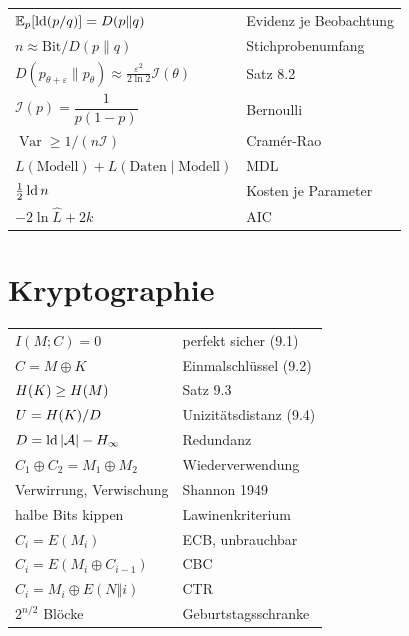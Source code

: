 \begin{merksatz}
\begin{center}
{\small
\renewcommand{\arraystretch}{1.62}
\begin{tabular}{@{}P{4.4cm}P{4.2cm}@{}}
\toprule
$\mathbb{E}_p[\operatorname{ld}(p/q)] = D(p\|q)$ & Evidenz je Beobachtung\\
$n \approx \text{Bit}/D(p\|q)$ & Stichprobenumfang\\
$D(p_{\theta+\varepsilon}\|p_\theta) \approx \frac{\varepsilon^2}{2\ln2}\mathcal I(\theta)$ & Satz 8.2\\
$\mathcal I(p) = \dfrac{1}{p(1-p)}$ & Bernoulli\\
$\operatorname{Var} \ge 1/(n\mathcal I)$ & Cramér-Rao\\
$L(\text{Modell})+L(\text{Daten}\mid\text{Modell})$ & MDL\\
$\tfrac12\operatorname{ld} n$ & Kosten je Parameter\\
$-2\ln\hat L+2k$ & AIC\\
\bottomrule
\end{tabular}}
\end{center}
\end{merksatz}

\section{Kryptographie}

\begin{merksatz}
\begin{center}
{\small
\renewcommand{\arraystretch}{1.62}
\begin{tabular}{@{}P{4.4cm}P{4.2cm}@{}}
\toprule
$I(M;C) = 0$ & perfekt sicher (9.1)\\
$C = M\oplus K$ & Einmalschlüssel (9.2)\\
$H(K) \ge H(M)$ & Satz 9.3\\
$U = H(K)/D$ & Unizitätsdistanz (9.4)\\
$D = \operatorname{ld}|\mathcal A| - H_\infty$ & Redundanz\\
$C_1\oplus C_2 = M_1\oplus M_2$ & Wiederverwendung\\
Verwirrung, Verwischung & Shannon 1949\\
halbe Bits kippen & Lawinenkriterium\\
$C_i = E(M_i)$ & ECB, \textcolor{akzent}{unbrauchbar}\\
$C_i = E(M_i\oplus C_{i-1})$ & CBC\\
$C_i = M_i\oplus E(N\Vert i)$ & CTR\\
$2^{n/2}$ Blöcke & Geburtstagsschranke\\
\bottomrule
\end{tabular}}
\end{center}
\end{merksatz}


